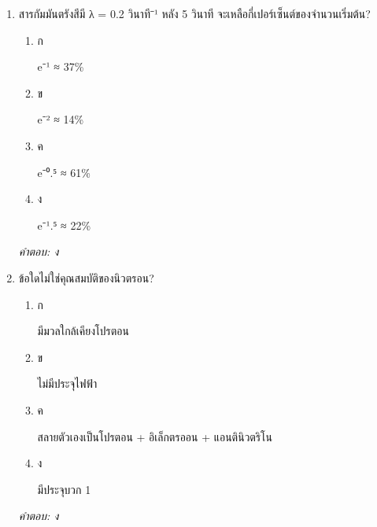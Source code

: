 \documentclass[12pt]{article}
\begin{document}
\begin{enumerate}[label=\arabic*., itemsep=0.5\baselineskip, topsep=0.5\baselineskip, leftmargin=*]
\item สารกัมมันตรังสีมี λ = 0.2 วินาที⁻¹ หลัง 5 วินาที จะเหลือกี่เปอร์เซ็นต์ของจำนวนเริ่มต้น?
\begin{enumerate}[label=\alph*)., itemsep=0.3\baselineskip, topsep=0.3\baselineskip]
\item ก\ 
\begin{minipage}[t]{0.9\linewidth}
\raggedright e⁻¹ ≈ 37\%
\end{minipage}
\item ข\ 
\begin{minipage}[t]{0.9\linewidth}
\raggedright e⁻² ≈ 14\%
\end{minipage}
\item ค\ 
\begin{minipage}[t]{0.9\linewidth}
\raggedright e⁻⁰.⁵ ≈ 61\%
\end{minipage}
\item ง\ 
\begin{minipage}[t]{0.9\linewidth}
\raggedright e⁻¹.⁵ ≈ 22\%
\end{minipage}
\end{enumerate}
\vspace{-0.3\baselineskip}
\begin{small}
\textit{คำตอบ: ง}
\end{small}

\item ข้อใดไม่ใช่คุณสมบัติของนิวตรอน?
\begin{enumerate}[label=\alph*)., itemsep=0.3\baselineskip, topsep=0.3\baselineskip]
\item ก\ 
\begin{minipage}[t]{0.9\linewidth}
\raggedright มีมวลใกล้เคียงโปรตอน
\end{minipage}
\item ข\ 
\begin{minipage}[t]{0.9\linewidth}
\raggedright ไม่มีประจุไฟฟ้า
\end{minipage}
\item ค\ 
\begin{minipage}[t]{0.9\linewidth}
\raggedright สลายตัวเองเป็นโปรตอน + อิเล็กตรออน + แอนตินิวตริโน
\end{minipage}
\item ง\ 
\begin{minipage}[t]{0.9\linewidth}
\raggedright มีประจุบวก 1
\end{minipage}
\end{enumerate}
\vspace{-0.3\baselineskip}
\begin{small}
\textit{คำตอบ: ง}
\end{small}


\end{enumerate}
\end{document}
